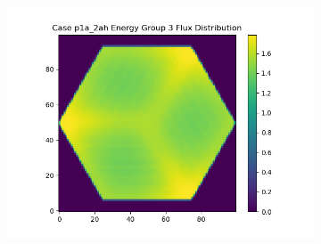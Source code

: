 \documentclass[letterpaper,11pt]{report}
\begin{document}
\begin{figure}[H]
\begin{subfigure}{.33\textwidth}
        \includegraphics[width=1.1\linewidth]{../../phase1a/case2ah/analysis_output/p1a_2ah_e_eg3.png}
        \caption{}
      \end{subfigure}


\end{figure}
\end{document}
